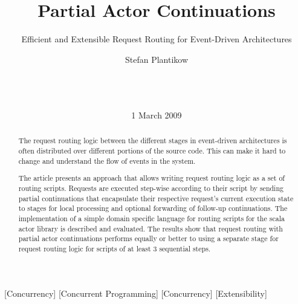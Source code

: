 \documentclass{sig-alternate}
\begin{document}

\title{Partial Actor Continuations}
\subtitle{Efficient and Extensible Request Routing for Event-Driven Architectures}


\author{
\alignauthor
Stefan Plantikow\\
       \\
       \\
       \\
}

\date{1 March 2009}


\maketitle

\begin{abstract}

The request routing logic between the different stages in event-driven architectures is often
distributed over different portions of the source code. This can make it hard to change and
understand the flow of events in the system.

The article presents an approach that allows writing request routing logic as a set of routing
scripts. Requests are executed step-wise according to their script by sending partial continuations
that encapsulate their respective request's current execution state to stages for local processing
and optional forwarding of follow-up continuations. The implementation of a simple domain specific
language for routing scripts for the scala actor library is described and evaluated. The results
show that request routing with partial actor continuations performs equally or better to using a
separate stage for request routing logic for scripts of at least 3 sequential steps. 

\end{abstract}

[Concurrency]         
[Concurrent Programming]         
[Concurrency]
[Extensibility]

\end{document}
